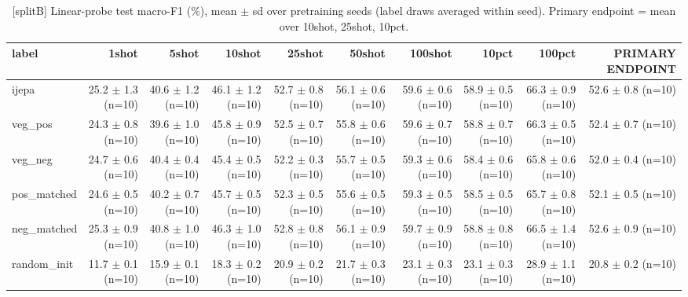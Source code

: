 \begin{table}[t]
\centering
\small
\caption{[splitB] Linear-probe test macro-F1 (\%), mean $\pm$ sd over pretraining seeds (label draws averaged within seed). Primary endpoint = mean over 10shot, 25shot, 10pct.}
\label{tab:main_results_probe}
\begin{tabular}{lrrrrrrrrr}
\toprule
label & 1shot & 5shot & 10shot & 25shot & 50shot & 100shot & 10pct & 100pct & PRIMARY ENDPOINT \\
\midrule
ijepa & 25.2 $\pm$ 1.3 (n=10) & 40.6 $\pm$ 1.2 (n=10) & 46.1 $\pm$ 1.2 (n=10) & 52.7 $\pm$ 0.8 (n=10) & 56.1 $\pm$ 0.6 (n=10) & 59.6 $\pm$ 0.6 (n=10) & 58.9 $\pm$ 0.5 (n=10) & 66.3 $\pm$ 0.9 (n=10) & 52.6 $\pm$ 0.8 (n=10) \\
veg\_pos & 24.3 $\pm$ 0.8 (n=10) & 39.6 $\pm$ 1.0 (n=10) & 45.8 $\pm$ 0.9 (n=10) & 52.5 $\pm$ 0.7 (n=10) & 55.8 $\pm$ 0.6 (n=10) & 59.6 $\pm$ 0.7 (n=10) & 58.8 $\pm$ 0.7 (n=10) & 66.3 $\pm$ 0.5 (n=10) & 52.4 $\pm$ 0.7 (n=10) \\
veg\_neg & 24.7 $\pm$ 0.6 (n=10) & 40.4 $\pm$ 0.4 (n=10) & 45.4 $\pm$ 0.5 (n=10) & 52.2 $\pm$ 0.3 (n=10) & 55.7 $\pm$ 0.5 (n=10) & 59.3 $\pm$ 0.6 (n=10) & 58.4 $\pm$ 0.6 (n=10) & 65.8 $\pm$ 0.6 (n=10) & 52.0 $\pm$ 0.4 (n=10) \\
pos\_matched & 24.6 $\pm$ 0.5 (n=10) & 40.2 $\pm$ 0.7 (n=10) & 45.7 $\pm$ 0.5 (n=10) & 52.3 $\pm$ 0.5 (n=10) & 55.6 $\pm$ 0.5 (n=10) & 59.3 $\pm$ 0.5 (n=10) & 58.5 $\pm$ 0.5 (n=10) & 65.7 $\pm$ 0.8 (n=10) & 52.1 $\pm$ 0.5 (n=10) \\
neg\_matched & 25.3 $\pm$ 0.9 (n=10) & 40.8 $\pm$ 1.0 (n=10) & 46.3 $\pm$ 1.0 (n=10) & 52.8 $\pm$ 0.8 (n=10) & 56.1 $\pm$ 0.9 (n=10) & 59.7 $\pm$ 0.9 (n=10) & 58.8 $\pm$ 0.8 (n=10) & 66.5 $\pm$ 1.4 (n=10) & 52.6 $\pm$ 0.9 (n=10) \\
random\_init & 11.7 $\pm$ 0.1 (n=10) & 15.9 $\pm$ 0.1 (n=10) & 18.3 $\pm$ 0.2 (n=10) & 20.9 $\pm$ 0.2 (n=10) & 21.7 $\pm$ 0.3 (n=10) & 23.1 $\pm$ 0.3 (n=10) & 23.1 $\pm$ 0.3 (n=10) & 28.9 $\pm$ 1.1 (n=10) & 20.8 $\pm$ 0.2 (n=10) \\
\bottomrule
\end{tabular}
\end{table}
